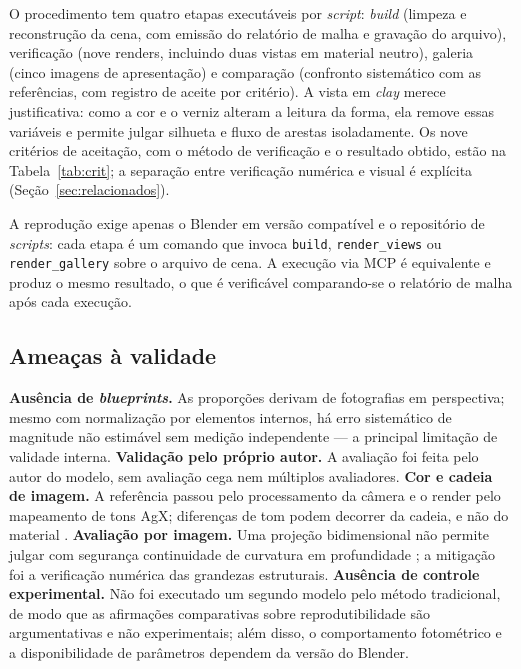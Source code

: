 O procedimento tem quatro etapas execut\'aveis por \emph{script}: \emph{build} (limpeza
e reconstru\c{c}\~ao da cena, com emiss\~ao do relat\'orio de malha e
grava\c{c}\~ao do arquivo), verifica\c{c}\~ao (nove renders, incluindo duas vistas em
material neutro), galeria (cinco imagens de apresenta\c{c}\~ao) e compara\c{c}\~ao
(confronto sistem\'atico com as refer\^encias, com registro de aceite por crit\'erio). A
vista em \emph{clay} merece justificativa: como a cor e o verniz alteram a leitura da
forma, ela remove essas vari\'aveis e permite julgar silhueta e fluxo de arestas
isoladamente. Os nove crit\'erios de aceita\c{c}\~ao, com o m\'etodo de
verifica\c{c}\~ao e o resultado obtido, est\~ao na Tabela~\ref{tab:crit}; a
separa\c{c}\~ao entre verifica\c{c}\~ao num\'erica e visual \'e expl\'icita
(Se\c{c}\~ao~\ref{sec:relacionados}).

A reprodu\c{c}\~ao exige apenas o Blender em vers\~ao compat\'ivel e o reposit\'orio de
\emph{scripts}: cada etapa \'e um comando que invoca \texttt{build},
\texttt{render\_views} ou \texttt{render\_gallery} sobre o arquivo de cena. A
execu\c{c}\~ao via MCP \'e equivalente e produz o mesmo resultado, o que \'e
verific\'avel comparando-se o relat\'orio de malha ap\'os cada execu\c{c}\~ao.

\subsection{Amea\c{c}as \`a validade}
\label{sec:ameacas}

\textbf{Aus\^encia de \emph{blueprints}.} As propor\c{c}\~oes derivam de fotografias em
perspectiva; mesmo com normaliza\c{c}\~ao por elementos internos, h\'a erro sistem\'atico
de magnitude n\~ao estim\'avel sem medi\c{c}\~ao independente --- a principal
limita\c{c}\~ao de validade interna. \textbf{Valida\c{c}\~ao pelo pr\'oprio autor.} A
avalia\c{c}\~ao foi feita pelo autor do modelo, sem avalia\c{c}\~ao cega nem
m\'ultiplos avaliadores. \textbf{Cor e cadeia de imagem.} A refer\^encia passou pelo
processamento da c\^amera e o render pelo mapeamento de tons AgX;
diferen\c{c}as de tom podem decorrer da cadeia, e n\~ao do material
\cite{fairchild2013}. \textbf{Avalia\c{c}\~ao por imagem.} Uma proje\c{c}\~ao
bidimensional n\~ao permite julgar com seguran\c{c}a continuidade de curvatura em
profundidade \cite{hartley2004}; a mitiga\c{c}\~ao foi a verifica\c{c}\~ao num\'erica
das grandezas estruturais. \textbf{Aus\^encia de controle experimental.} N\~ao foi
executado um segundo modelo pelo m\'etodo tradicional, de modo que as
afirma\c{c}\~oes comparativas sobre reprodutibilidade s\~ao argumentativas e n\~ao
experimentais; al\'em disso, o comportamento fotom\'etrico e a disponibilidade de
par\^ametros dependem da vers\~ao do Blender.
